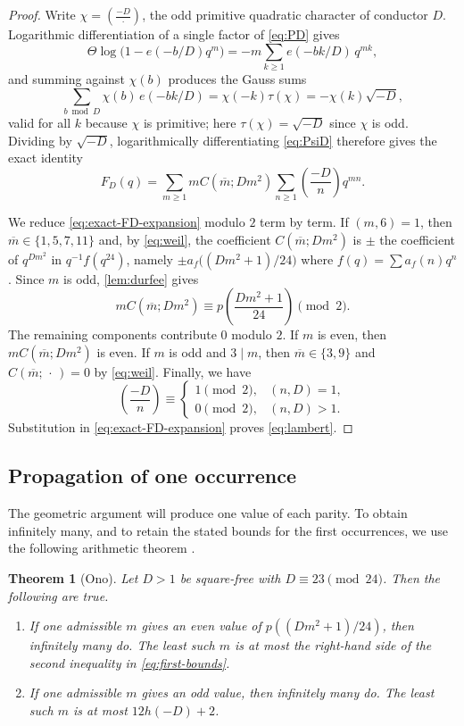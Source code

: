 \documentclass[11pt]{amsart}
\newtheorem{theorem}{Theorem}
\theoremstyle{remark}
\numberwithin{equation}{section}
\newcommand{\leg}[2]{\left(\frac{#1}{#2}\right)}
\begin{document}
\begin{proof}
 Write $\chi=\leg{-D}{\cdot}$, the odd primitive quadratic character of
 conductor $D$.  Logarithmic differentiation of a single factor of
 \eqref{eq:PD} gives
 \[
  \Theta\log\bigl(1-e(-b/D)q^m\bigr)
  =-m\sum_{k\geq1}e(-bk/D)\,q^{mk},
 \]
 and summing against $\chi(b)$ produces the Gauss sums
 \[
  \sum_{b\bmod D}\chi(b)\,e(-bk/D)=\chi(-k)\tau(\chi)=-\chi(k)\sqrt{-D},
 \]
 valid for all $k$ because $\chi$ is primitive; here
 $\tau(\chi)=\sqrt{-D}$ since $\chi$ is odd.  Dividing by $\sqrt{-D}$,
 logarithmically differentiating \eqref{eq:PsiD} therefore gives the exact
 identity
 \begin{equation}\label{eq:exact-FD-expansion}
  F_D(q)=\sum_{m\geq1}mC(\overline m;Dm^2)
  \sum_{n\geq1}\leg{-D}{n}q^{mn}.
 \end{equation}
 
 We reduce \eqref{eq:exact-FD-expansion} modulo $2$ term by term.  If
 $(m,6)=1$, then $\overline m\in\{1,5,7,11\}$ and, by \eqref{eq:weil}, the
 coefficient $C(\overline m;Dm^2)$ is $\pm$ the coefficient of $q^{Dm^2}$
 in $q^{-1}f(q^{24})$, namely $\pm a_f\bigl((Dm^2+1)/24\bigr)$ where
 $f(q)=\sum a_f(n)q^n$.  Since $m$ is odd, \cref{lem:durfee} gives
 \[
  mC(\overline m;Dm^2)\equiv
  p\!\left(\frac{Dm^2+1}{24}\right)\pmod2.
 \]
 The remaining components contribute $0$ modulo $2$.  If $m$ is even, then
 $mC(\overline m;Dm^2)$ is even.  If $m$ is odd and $3\mid m$, then
 $\overline m\in\{3,9\}$ and $C(\overline m;\,\cdot\,)=0$ by
 \eqref{eq:weil}.
 Finally, we have
 \[
  \leg{-D}{n}\equiv
  \begin{cases}
   1\pmod2,&(n,D)=1,\\
   0\pmod2,&(n,D)>1.
  \end{cases}
 \]
 Substitution in \eqref{eq:exact-FD-expansion} proves
 \eqref{eq:lambert}.  
\end{proof}

\subsection{Propagation of one occurrence}

The geometric argument will produce one value of each parity.  To obtain
infinitely many, and to retain the stated bounds for the first occurrences,
we use the following arithmetic theorem
\cite[Theorem~1.2]{Ono2010}.

\begin{theorem}[Ono]\label{thm:propagation}
 Let $D>1$ be square-free with $D\equiv23\pmod{24}$.  Then the following are true.
 \begin{enumerate}
 \item If one admissible $m$ gives an even value of
 $p((Dm^2+1)/24)$, then infinitely many do.  The least such $m$ is at
 most the right-hand side of the second inequality in
 \eqref{eq:first-bounds}.
 \item If one admissible $m$ gives an odd value, then infinitely many do.
 The least such $m$ is at most $12h(-D)+2$.
 \end{enumerate}
\end{theorem}
\end{document}
